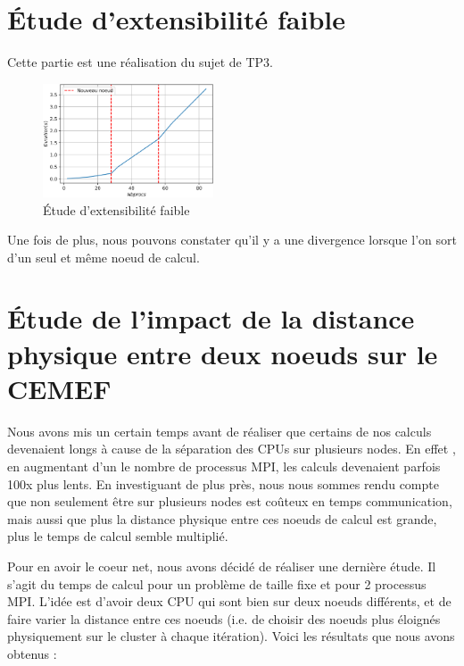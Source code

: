 \documentclass[10pt,twocolumn,letterpaper]{article}
\begin{document}
\section{Étude d'extensibilité faible}

Cette partie est une réalisation du sujet de TP3.

\begin{figure}[H]
    \centering
    \caption{Étude d'extensibilité faible}
    \includegraphics[width=0.45\textwidth]{fig/weak_scalab.png}
  \end{figure}


Une fois de plus, nous pouvons constater qu'il y a une divergence lorsque l'on
sort d'un seul et même noeud de calcul.

\section{Étude de l'impact de la distance physique entre deux 
noeuds sur le CEMEF}

Nous avons mis un certain temps avant de réaliser que certains de nos calculs
devenaient longs à cause de la séparation des CPUs sur plusieurs nodes. En effet
, en augmentant d'un le nombre de processus MPI, les calculs devenaient parfois
100x plus lents. En investiguant de plus près, nous nous sommes rendu compte que
non seulement être sur plusieurs nodes est coûteux en temps communication,
mais aussi que plus la distance physique entre ces noeuds de calcul est grande,
plus le temps de calcul semble multiplié.

Pour en avoir le coeur net, nous avons décidé de réaliser une dernière étude. Il
s'agit du temps de calcul pour un problème de taille fixe et pour 2 processus
MPI. L'idée est d'avoir deux CPU qui sont bien sur deux noeuds différents, et de
faire varier la distance entre ces noeuds (i.e. de choisir des noeuds plus
éloignés physiquement sur le cluster à chaque itération). Voici les résultats
que nous avons obtenus :
\end{document}
